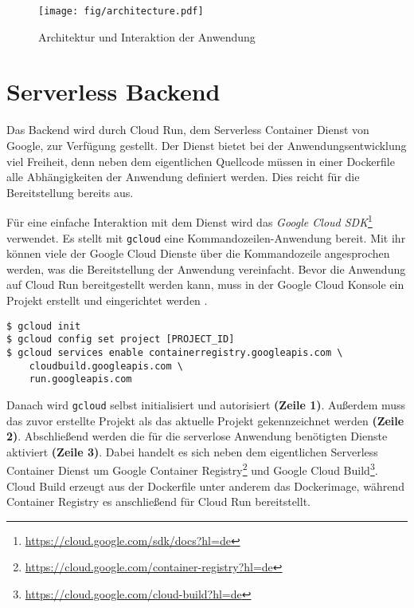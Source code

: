 \begin{figure}
  \centering
  \texttt{[image: fig/architecture.pdf]}
  \caption{Architektur und Interaktion der Anwendung}
  \label{fig:architecture}
\end{figure}

\section{Serverless Backend}
Das Backend wird durch Cloud Run, dem Serverless Container Dienst von Google, zur Verfügung gestellt.
Der Dienst bietet bei der Anwendungsentwicklung viel Freiheit, denn 
neben dem eigentlichen Quellcode müssen in einer Dockerfile alle Abhängigkeiten der Anwendung
definiert werden. Dies reicht für die Bereitstellung bereits aus.

Für eine einfache Interaktion mit dem Dienst wird das
\emph{Google Cloud SDK}\footnote{\url{https://cloud.google.com/sdk/docs?hl=de}} verwendet.
Es stellt mit \texttt{gcloud} eine Kommandozeilen-Anwendung bereit.
Mit ihr können viele der Google Cloud Dienste über die Kommandozeile angesprochen werden,
was die Bereitstellung der Anwendung vereinfacht.
Bevor die Anwendung auf Cloud Run bereitgestellt werden kann, muss in der
Google Cloud Konsole ein Projekt erstellt und eingerichtet werden \cite{CloudRunInstructions}.\\

\begin{lstlisting}[caption={Google Cloud SDK einrichten}, label={lst:gcloud_init}]
$ gcloud init
$ gcloud config set project [PROJECT_ID]
$ gcloud services enable containerregistry.googleapis.com \            
    cloudbuild.googleapis.com \
    run.googleapis.com
\end{lstlisting}

Danach wird \texttt{gcloud} selbst initialisiert und autorisiert \textbf{(Zeile 1)}.
Außerdem muss das zuvor erstellte Projekt als das aktuelle Projekt gekennzeichnet werden \textbf{(Zeile 2)}.
Abschließend werden die für die serverlose Anwendung  benötigten Dienste aktiviert \textbf{(Zeile 3)}.
Dabei handelt es sich neben dem eigentlichen Serverless Container Dienst um
Google Container Registry\footnote{\url{https://cloud.google.com/container-registry?hl=de}}
und Google Cloud Build\footnote{\url{https://cloud.google.com/cloud-build?hl=de}}.
Cloud Build erzeugt aus der Dockerfile unter anderem das Dockerimage, während Container Registry
es anschließend für Cloud Run bereitstellt.

